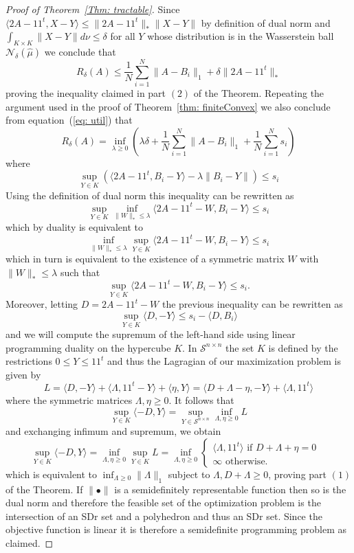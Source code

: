 \documentclass[12pt]{amsart}
\theoremstyle{remark}
\begin{document}
\begin{proof}[Proof of Theorem~\ref{Thm: tractable}]
Since $\langle 2A-11^t, X-Y\rangle\leq \|2A-11^t\|_*\|X-Y\|$ by definition of dual norm and $\int_{K\times K} \|X-Y\|d\nu\leq \delta$ for all $Y$ whose distribution is in the Wasserstein ball $\mathcal{N}_{\delta}(\hat{\mu})$ we conclude that
\[R_{\delta}(A)\leq  \frac{1}{N}\sum_{i=1}^N \|A-B_i\|_1 + \delta\|2A-11^t\|_*\]
proving the inequality claimed in part $(2)$ of the Theorem.
Repeating the argument used in the proof of Theorem~\ref{thm: finiteConvex} we also conclude from equation~(\ref{eq: util}) that
\[ R_{\delta}(A)= \inf_{\lambda\geq 0}\left( \lambda\delta+ \frac{1}{N}\sum_{i=1}^N \|A-B_i\|_1 + \frac{1}{N}\sum_{i=1}^N s_i\right)\]
where 
\[\sup_{Y\in K} \left(\langle 2A-11^t,B_i-Y\rangle -\lambda \|B_i-Y\|\right)\leq s_i\]
Using the definition of dual norm this inequality can be rewritten as 
\[ \sup_{Y\in K}\inf_{\|W\|_*\leq \lambda} \langle 2A-11^t-W, B_i-Y\rangle\leq s_i \]
which by duality is equivalent to
\[ \inf_{\|W\|_*\leq \lambda} \sup_{Y\in K} \langle 2A-11^t-W, B_i-Y\rangle\leq s_i \]
which in turn is equivalent to the existence of a symmetric matrix $W$ with $\|W\|_*\leq \lambda$ such that
\[\sup_{Y\in K} \langle 2A-11^t-W, B_i-Y\rangle\leq s_i.\]
Moreover, letting $D=2A-11^t-W$ the previous inequality can be rewritten as
\[\sup_{Y\in K} \langle D,-Y\rangle \leq s_i-\langle D,B_i\rangle\] 
and we will compute the supremum of the left-hand side using linear programming duality on the hypercube $K$. In $\mathcal{S}^{n\times n}$ the set $K$ is defined by the restrictions $0 \leq Y \leq 11^t$  and thus the Lagragian of our maximization problem is given by 
\[
L = \langle D,-Y \rangle + \langle \Lambda,11^t-Y \rangle + \langle \eta,Y \rangle 
= \langle D+\Lambda -\eta,-Y \rangle + \langle \Lambda,11^t\rangle \]
where the symmetric matrices $\Lambda,\eta \geq 0$.
It follows that
\[
\sup_{Y \in K}\langle -D,Y \rangle = \sup_{Y \in \mathcal{S}^{n\times n}} \inf_{\Lambda,\eta \geq 0} L 
\]
and exchanging infimum and supremum, we obtain  
\[
\sup_{Y \in K}\langle -D,Y \rangle = \inf_{\Lambda,\eta \geq 0}\sup_{Y \in K}L= \inf_{\Lambda,\eta \geq 0} 
\begin{cases}
\langle \Lambda, 11^t \rangle \text{ if $D+\Lambda + \eta = 0$ }\\
\infty \text{ otherwise.}
\end{cases}
\]
which is equivalent to $\inf_{\Lambda \geq0}\|\Lambda\|_1$ subject to $\Lambda, D+\Lambda\geq 0$, proving part $(1)$ of the Theorem. If $\|\bullet\|$ is a semidefinitely representable function then so is the dual norm and therefore the feasible set of the optimization problem is the intersection of an SDr set and a polyhedron and thus an SDr set. Since the objective function is linear it is therefore a semidefinite programming problem as claimed.
\end{proof}
\end{document}
